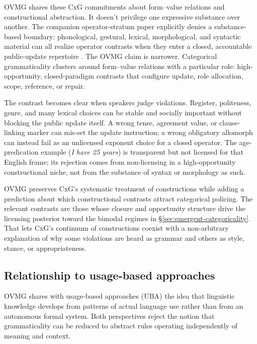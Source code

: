 \documentclass[12pt,letterpaper]{article}
\newcommand{\mention}[1]{\textit{#1}}
\begin{document}
OVMG shares these CxG commitments about form--value relations and constructional
abstraction. It doesn't privilege one expressive substance over another. The
companion operator-stratum paper explicitly denies a substance-based boundary:
phonological, gestural, lexical, morphological, and syntactic material can all
realize operator contrasts when they enter a closed, accountable public-update
repertoire \autocite{reynolds2026operators}. The OVMG claim is narrower.
Categorical grammaticality clusters around form--value relations with a
particular role: high-opportunity, closed-paradigm contrasts that configure
update, role allocation, scope, reference, or repair.

The contrast becomes clear when speakers judge violations. Register, politeness,
genre, and many lexical choices can be stable and socially important without
blocking the public update itself. A wrong tense, agreement value, or
clause-linking marker can mis-set the update instruction; a wrong obligatory
allomorph can instead fail as an unlicensed exponent choice for a closed
operator. The age-predication example (\mention{I have 25 years}) is transparent
but not licensed for that English frame; its rejection comes from non-licensing
in a high-opportunity constructional niche, not from the substance of syntax or
morphology as such.

OVMG preserves CxG's systematic treatment of constructions while adding a prediction about which constructional contrasts attract categorical policing. The relevant contrasts are those whose closure and opportunity structure drive the licensing posterior toward the bimodal regimes in \S\ref{sec:emergent-categoricality}. That lets CxG's continuum of constructions coexist with a non-arbitrary explanation of why some violations are heard as grammar and others as style, stance, or appropriateness.

\subsection{Relationship to usage-based approaches}\label{sec:usage-based}

OVMG shares with usage-based approaches (UBA) \autocite{bybee2006, bybee2007frequency, bybee2010} the idea that linguistic knowledge develops from patterns of actual language use rather than from an autonomous formal system. Both perspectives reject the notion that grammaticality can be reduced to abstract rules operating independently of meaning and context.
\end{document}
